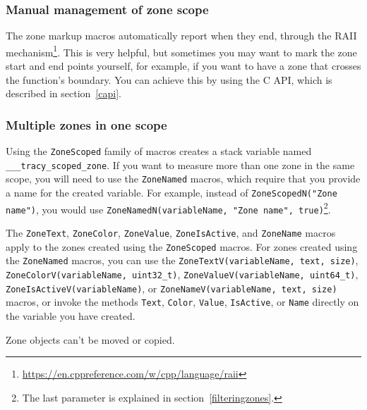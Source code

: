 \documentclass[hidelinks,titlepage,a4paper,twoside]{article}
\begin{document}
\subsubsection{Manual management of zone scope}

The zone markup macros automatically report when they end, through the RAII mechanism\footnote{\url{https://en.cppreference.com/w/cpp/language/raii}}. This is very helpful, but sometimes you may want to mark the zone start and end points yourself, for example, if you want to have a zone that crosses the function's boundary. You can achieve this by using the C API, which is described in section~\ref{capi}.

\subsubsection{Multiple zones in one scope}
\label{multizone}

Using the \texttt{ZoneScoped} family of macros creates a stack variable named \texttt{\_\_\_tracy\_scoped\_zone}. If you want to measure more than one zone in the same scope, you will need to use the \texttt{ZoneNamed} macros, which require that you provide a name for the created variable. For example, instead of \texttt{ZoneScopedN("Zone name")}, you would use \texttt{ZoneNamedN(variableName, "Zone name", true)}\footnote{The last parameter is explained in section~\ref{filteringzones}.}.

The \texttt{ZoneText}, \texttt{ZoneColor}, \texttt{ZoneValue}, \texttt{ZoneIsActive}, and \texttt{ZoneName} macros apply to the zones created using the \texttt{ZoneScoped} macros. For zones created using the \texttt{ZoneNamed} macros, you can use the \texttt{ZoneTextV(variableName, text, size)}, \texttt{ZoneColorV(variableName, uint32\_t)}, \texttt{ZoneValueV(variableName, uint64\_t)}, \texttt{ZoneIsActiveV(variableName)}, or \texttt{ZoneNameV(variableName, text, size)} macros, or invoke the methods \texttt{Text}, \texttt{Color}, \texttt{Value}, \texttt{IsActive}, or \texttt{Name} directly on the variable you have created.

Zone objects can't be moved or copied.
\end{document}
